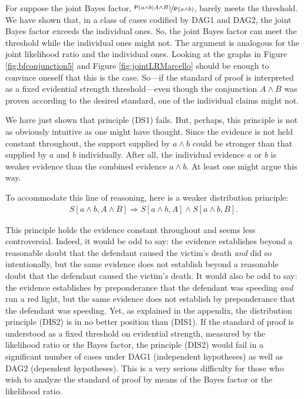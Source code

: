 \documentclass[
  10pt,
  dvipsnames,enabledeprecatedfontcommands]{scrartcl}
\newcommand{\et}{\wedge}
\newcommand{\pr}[1]{\ensuremath{\mathsf{P}(#1)}}
\begin{document}
For suppose the joint Bayes factor,
\(\nicefrac{\pr{a \et b \vert A \et B}}{\pr{a \et b}}\), barely meets
the threshold. We have shown that, in a class of cases codified by
\textsf{DAG1} and \textsf{DAG2}, the joint Bayes factor exceeds the
individual ones. So, the joint Bayes factor can meet the threshold while
the individual ones might not. The argument is analogous for the joint
likelihood ratio and the individual ones. Looking at the graphs in
Figure \ref{fig:bfconjunction5} and Figure \ref{fig:jointLRMarcello}
should be enough to convince oneself that this is the case. So---if the
standard of proof is interpreted as a fixed evidential strength
threshold---even though the conjunction \(A \et B\) was proven according
to the desired standard, one of the individual claims might not.

We have just shown that principle (DS1) fails. But, perhaps, this
principle is not as obviously intuitive as one might have thought. Since
the evidence is not held constant throughout, the support supplied by
\(a\wedge b\) could be stronger than that supplied by \(a\) and \(b\)
individually. After all, the individual evidence \(a\) or \(b\) is
weaker evidence than the combined evidence \(a\wedge b\). At least one
might argue this way.

To accommodate this line of reasoning, here is a weaker distribution
principle: \begin{align}
S[a \wedge b, A\wedge B] \Rightarrow S[a \wedge b, A] \wedge S[a\wedge b, B]. \tag{DIS2}
\end{align}

\noindent This principle holds the evidence constant throughout and
seems less controversial. Indeed, it would be odd to say: the evidence
establishes beyond a reasonable doubt that the defendant caused the
victim's death \textit{and} did so intentionally, but the same evidence
does not establish beyond a reasonable doubt that the defendant caused
the victim's death. It would also be odd to say: the evidence
establishes by preponderance that the defendant was speeding
\textit{and} run a red light, but the same evidence does not establish
by preponderance that the defendant was speeding. Yet, as explained in
the appendix, the distribution principle (DIS2) is in no better position
than (DIS1). If the standard of proof is understood as a fixed threshold
on evidential strength, measured by the likelihood ratio or the Bayes
factor, the principle (DIS2) would fail in a significant number of cases
under \textsf{DAG1} (independent hypotheses) as well as \textsf{DAG2}
(dependent hypotheses). This is a very serious difficulty for those who
wish to analyze the standard of proof by means of the Bayes factor or
the likelihood ratio.
\end{document}
